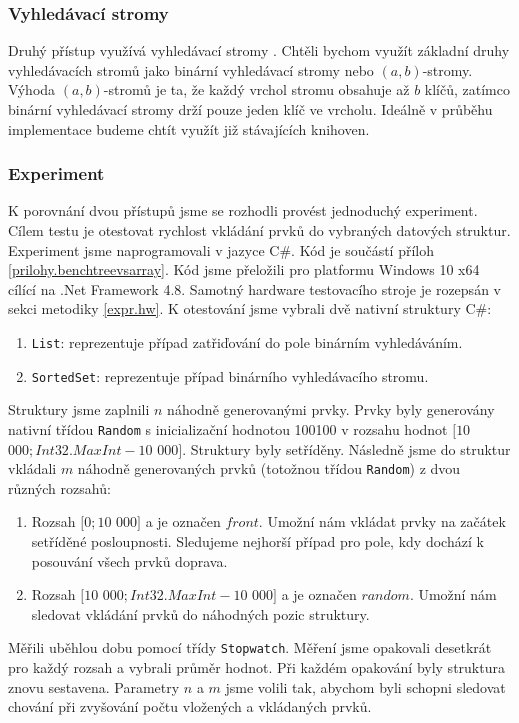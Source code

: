 \subsubsection{Vyhledávací stromy}

Druhý přístup využívá vyhledávací stromy \citep[str. 177]{labyrint}.
Chtěli bychom využít základní druhy vyhledávacích stromů jako binární vyhledávací stromy nebo $(a, b)$-stromy.
Výhoda $(a, b)$-stromů je ta, že každý vrchol stromu obsahuje až $b$ klíčů, zatímco binární vyhledávací stromy drží pouze jeden klíč ve vrcholu.
Ideálně v průběhu implementace budeme chtít využít již stávajících knihoven.

\subsubsection{Experiment}

K porovnání dvou přístupů jsme se rozhodli provést jednoduchý experiment.
Cílem testu je otestovat rychlost vkládání prvků do vybraných datových struktur.
Experiment jsme naprogramovali v jazyce C\#.
Kód je součástí příloh \ref{prilohy.benchtreevsarray}.
Kód jsme přeložili pro platformu Windows 10 x64 cílící na .Net Framework 4.8.
Samotný hardware testovacího stroje je rozepsán v sekci metodiky \ref{expr.hw}.
K otestování jsme vybrali dvě nativní struktury C\#:
\begin{enumerate}
\item \texttt{List}: reprezentuje případ zatřiďování do pole binárním vyhledáváním.
\item \texttt{SortedSet}: reprezentuje případ binárního vyhledávacího stromu.
\end{enumerate}
Struktury jsme zaplnili $n$ náhodně generovanými prvky.
Prvky byly generovány nativní třídou \texttt{Random} s inicializační hodnotou 100100 v rozsahu hodnot $[10$ $000; Int32.MaxInt - 10$ $000]$.
Struktury byly setříděny.
Následně jsme do struktur vkládali $m$ náhodně generovaných prvků (totožnou třídou \texttt{Random}) z dvou různých rozsahů:
\begin{enumerate}
\item Rozsah $[0; 10$ $000]$ a je označen $front$. 
Umožní nám vkládat prvky na začátek setříděné posloupnosti. 
Sledujeme nejhorší případ pro pole, kdy dochází k posouvání všech prvků doprava.
\item Rozsah $[10$ $000; Int32.MaxInt - 10$ $000]$ a je označen $random$.
Umožní nám sledovat vkládání prvků do náhodných pozic struktury.
\end{enumerate}
Měřili uběhlou dobu pomocí třídy \texttt{Stopwatch}.
Měření jsme opakovali desetkrát pro každý rozsah a vybrali průměr hodnot.
Při každém opakování byly struktura znovu sestavena.
Parametry $n$ a $m$ jsme volili tak, abychom byli schopni sledovat chování při zvyšování počtu vložených a vkládaných prvků. 

